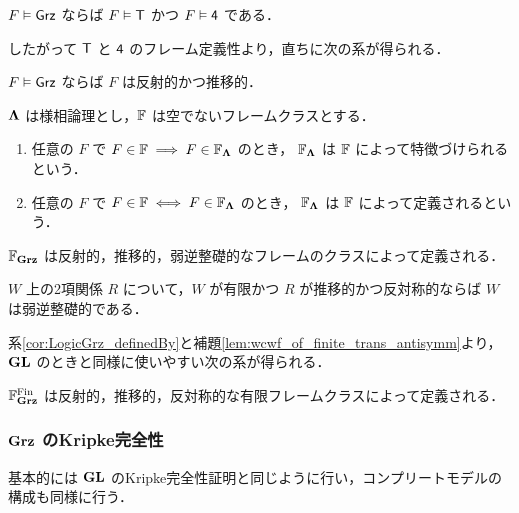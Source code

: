 \documentclass{jlreq}
\begin{document}
\begin{lemma}
	$F \vDash \mathsf{Grz}$ ならば $F \vDash \mathsf{T}$ かつ $F \vDash \mathsf{4}$ である．
\end{lemma}

したがって $\mathsf{T}$ と $\mathsf{4}$ のフレーム定義性より，直ちに次の系が得られる．

\begin{corollary}
	$F \vDash \mathsf{Grz}$ ならば $F$ は反射的かつ推移的．
\end{corollary}

\begin{definition}
	$\mathbf{\Lambda}$ は様相論理とし，$\mathbb{F}$ は空でないフレームクラスとする．
	\begin{enumerate}
		\item
		      任意の $F$ で $F \in \mathbb{F} \implies F \in \mathbb{F}_{\mathbf{\Lambda}} $ のとき，
		      $\mathbb{F}_{\mathbf{\Lambda}}$ は $\mathbb{F}$ によって特徴づけられるという．
		\item
		      任意の $F$ で $F \in \mathbb{F} \iff F \in \mathbb{F}_{\mathbf{\Lambda}} $ のとき，
		      $\mathbb{F}_{\mathbf{\Lambda}}$ は $\mathbb{F}$ によって定義されるという．
	\end{enumerate}
\end{definition}

\begin{corollary} \label{cor:LogicGrz_definedBy}
	$\mathbb{F}_{\mathbf{Grz}}$ は反射的，推移的，弱逆整礎的なフレームのクラスによって定義される．
\end{corollary}

\begin{lemma}\label{lem:wcwf_of_finite_trans_antisymm}
	$W$ 上の2項関係 $R$ について，$W$ が有限かつ $R$ が推移的かつ反対称的ならば $W$ は弱逆整礎的である．
\end{lemma}

系\ref{cor:LogicGrz_definedBy}と補題\ref{lem:wcwf_of_finite_trans_antisymm}より，$\mathbf{GL}$ のときと同様に使いやすい次の系が得られる．
\begin{corollary}
	$\mathbb{F}^{\mathrm{Fin}}_{\mathbf{Grz}}$ は反射的，推移的，反対称的な有限フレームクラスによって定義される．
\end{corollary}

\subsubsection{$\mathbf{Grz}$ のKripke完全性}

基本的には $\mathbf{GL}$ のKripke完全性証明と同じように行い，コンプリートモデルの構成も同様に行う．
\end{document}
